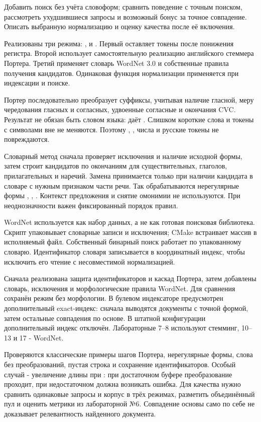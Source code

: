 \task
Добавить поиск без учёта словоформ; сравнить поведение с точным поиском,
рассмотреть ухудшившиеся запросы и возможный бонус за точное совпадение.
Описать выбранную нормализацию и оценку качества после её включения.

\method
Реализованы три режима: ,  и .
Первый оставляет токены после понижения регистра. Второй использует
самостоятельную реализацию английского стеммера Портера. Третий применяет
словарь WordNet 3.0 и собственные правила получения кандидатов.
Одинаковая функция нормализации применяется при индексации и поиске.

Портер последовательно преобразует суффиксы, учитывая наличие гласной,
меру чередования гласных и согласных, удвоенные согласные и окончания CVC.
Результат не обязан быть словом языка:  даёт
. Слишком короткие слова и токены с символами вне
 не меняются. Поэтому ,
, числа и русские токены не повреждаются.

Словарный метод сначала проверяет исключения и наличие исходной формы,
затем строит кандидатов по окончаниям для существительных, глаголов,
прилагательных и наречий. Замена принимается только при наличии кандидата
в словаре с нужным признаком части речи. Так обрабатываются нерегулярные
формы , ,
. Контекст предложения и снятие омонимии не используются.
При неоднозначности важен фиксированный порядок правил.

WordNet используется как набор данных, а не как готовая поисковая
библиотека. Скрипт  упаковывает словарные записи
и исключения; CMake встраивает массив в исполняемый файл.
Собственный бинарный поиск работает по упакованному словарю.
Идентификатор словаря записывается в координатный индекс, чтобы исключить
его чтение с несовместимой нормализацией.

\journal
Сначала реализована защита идентификаторов и каскад Портера, затем
добавлены словарь, исключения и морфологические правила WordNet.
Для сравнения сохранён режим без морфологии. В булевом индексаторе
предусмотрен дополнительный exact-индекс: сначала выводятся документы
с точной формой, затем остальные совпадения по основе. В штатной
конфигурации дополнительный индекс отключён. Лабораторные 7--8 используют
стемминг, 10--13 и 17 - WordNet.

\testing
Проверяются классические примеры шагов Портера, нерегулярные формы,
слова без преобразований, пустая строка и сохранение идентификаторов.
Особый случай - увеличение длины при :
при достаточном буфере преобразование проходит, при недостаточном
должна возникать ошибка. Для качества нужно сравнить одинаковые запросы
и корпус в трёх режимах, разметить объединённый пул и оценить метрики
из лабораторной №6. Совпадение основы само по себе не доказывает
релевантность найденного документа.

